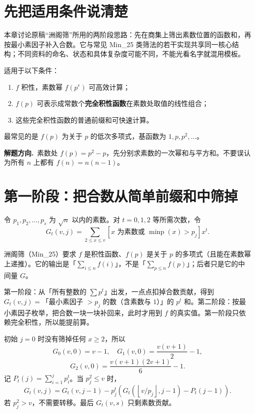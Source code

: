 \documentclass[UTF8,a4paper,11pt,twoside,openright,fontset=fandol]{ctexbook}
\theoremstyle{definition}
\newcommand{\floor}[1]{\left\lfloor #1\right\rfloor}
\newcommand{\hint}{\par\noindent\textbf{解题方向.}\ }
\begin{document}
\section{先把适用条件说清楚}
本章讨论原稿“洲阁筛”所用的两阶段思路：先在商集上筛出素数位置的函数和，再按最小素因子补入合数。它与常见 Min\_25 类筛法的若干实现共享同一核心结构；不同资料的命名、状态和具体复杂度可能不同，不能光看名字就混用模板。

适用于以下条件：
\begin{enumerate}
\item $f$ 积性，素数幂 $f(p^e)$ 可高效计算；
\item $f(p)$ 可表示成常数个\textbf{完全积性函数}在素数处取值的线性组合；
\item 这些完全积性函数的普通前缀和可快速计算。
\end{enumerate}
最常见的是 $f(p)$ 为关于 $p$ 的低次多项式，基函数为 $1,p,p^2,\ldots$。

\hint 素数处 $f(p)=p^2-p$，先分别求素数的一次幂和与平方和。不要误认为所有 $n$ 上都有 $f(n)=n(n-1)$。

\section{第一阶段：把合数从简单前缀和中筛掉}
令 $p_1,p_2,\ldots,p_s$ 为 $\sqrt n$ 以内的素数。对 $t=0,1,2$ 等所需次数，令
\[
 G_t(v,j)=\sum_{2\le x\le v}
 [x\text{ 为素数或 }\operatorname{minp}(x)>p_j]x^t.
\]

\begin{tip}[前提：洲阁筛的要求与它的输出]
洲阁筛（Min\_25）要求 $f$ 是积性函数、$f(p)$ 是关于 $p$ 的多项式（且能在素数幂上递推）。它的输出是「$\sum_{i\le n}f(i)$」，不是「$\sum_{p\le n}f(p)$」；后者只是它的中间量 $G$。
\end{tip}

\begin{tip}[两阶段各自在做什么]
第一阶段：从「所有整数的 $\sum p^t$」出发，一点点扣掉合数贡献，得到 $G_t(v,j)=$「最小素因子 $>p_j$ 的数（含素数与 $1$）」的 $p^t$ 和。第二阶段：按最小素因子枚举，把合数一块一块补回来，此时才用到 $f$ 的真实值。第一阶段只依赖完全积性，所以能提前算。
\end{tip}

初始 $j=0$ 时没有筛掉任何 $x\ge2$，所以
\[
G_0(v,0)=v-1,\quad G_1(v,0)=\frac{v(v+1)}2-1,
\]
\[
G_2(v,0)=\frac{v(v+1)(2v+1)}6-1.
\]
记 $P_t(j)=\sum_{i=1}^jp_i^t$。当 $p_j^2\le v$ 时，
\[
 G_t(v,j)=G_t(v,j-1)-p_j^t
 \left(G_t(\floor{v/p_j},j-1)-P_t(j-1)\right).
\]
若 $p_j^2>v$，不需要转移。最后 $G_t(v,s)$ 只剩素数贡献。
\end{document}
